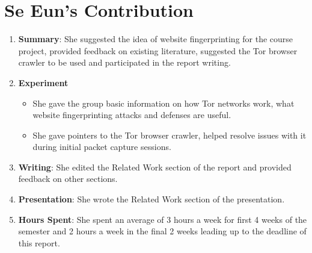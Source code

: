 \documentclass{article}
\begin{document}
\section{Se Eun's Contribution}
\begin{enumerate}
\item
{\bf Summary}:
She suggested the idea of website fingerprinting for the course project, provided feedback on existing literature, suggested the Tor browser crawler to be used and participated in the report writing.
\item
{\bf Experiment}
\begin{itemize}
\item
She gave the group basic information on how Tor networks work, what website fingerprinting attacks and defenses are useful.
\item
She gave pointers to the Tor browser crawler, helped resolve issues with it during initial packet capture sessions.
\end{itemize}
\item
{\bf Writing}: She edited the Related Work section of the report and provided feedback on other sections. 
\item
{\bf Presentation}: She wrote the Related Work section of the presentation.
\item
{\bf Hours Spent}: She spent an average of 3 hours a week for first 4 weeks of the semester and 2 hours a week in the final 2 weeks leading up to the deadline of this report.
\end{enumerate}
\end{document}
